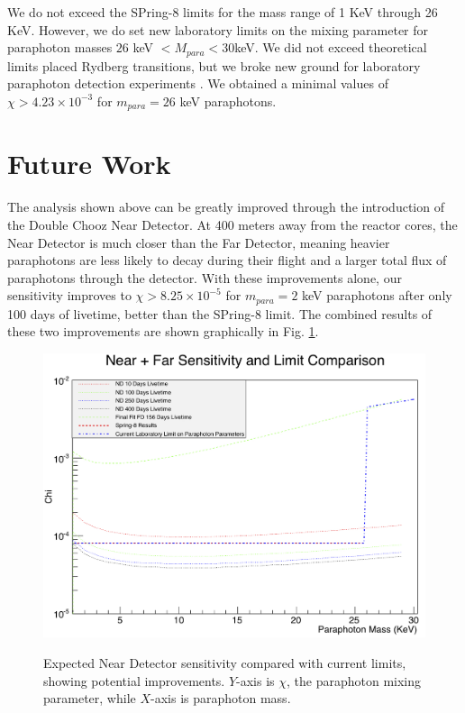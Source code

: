 We do not exceed the SPring-8 limits for the mass range of 1 KeV through 26 KeV. However, we do set new laboratory limits on the mixing parameter for paraphoton masses $26$ keV $< M_{para} < 30$keV. We did not exceed theoretical limits placed Rydberg transitions, but we broke new ground for laboratory paraphoton detection experiments \cite{Rydberg}. We obtained a minimal values of  $\chi > 4.23 \times 10^{-3}$ for $m_{para} =26$ keV paraphotons. 

\section{Future Work}
\label{sec:Future_Work}
The analysis shown above can be greatly improved through the introduction of the Double Chooz Near Detector. At 400 meters away from the reactor cores, the Near Detector is much closer than the Far Detector, meaning heavier paraphotons are less likely to decay during their flight and a larger total flux of paraphotons through the detector. With these improvements alone, our sensitivity improves to $\chi > 8.25 \times 10^{-5}$ for $m_{para} =2$ keV paraphotons after only 100 days of livetime, better than the SPring-8 limit. The combined results of these two improvements are shown graphically in Fig. \ref{FutureWork}. 

\begin{figure}
\caption{Expected Near Detector sensitivity compared with current limits, showing potential improvements. $Y$-axis is $\chi$, the paraphoton mixing parameter, while $X$-axis is paraphoton mass.}
\includegraphics[width =\textwidth]{Paraphotons/Future_Fits_W_Limits_156.jpg}
\label{FutureWork}
\end{figure}

